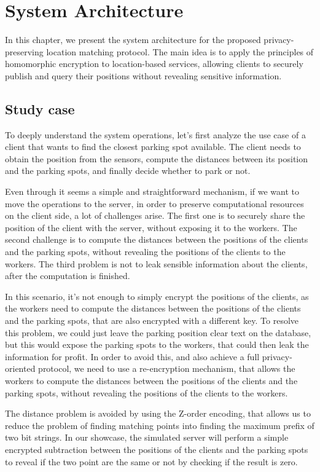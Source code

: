 \chapter{System Architecture}
In this chapter, we present the system architecture for the proposed privacy-preserving location matching protocol. The main idea is to apply the principles of homomorphic encryption to location-based services, allowing clients to securely publish and query their positions without revealing sensitive information.

\section{Study case}
To deeply understand the system operations, let's first analyze the use case of a client that wants to find the closest parking spot available. The client needs to obtain the position from the sensors, compute the distances between its position and the parking spots, and finally decide whether to park or not.

Even through it seems a simple and straightforward mechanism, if we want to move the operations to the server, in order to preserve computational resources on the client side, a lot of challenges arise. The first one is to securely share the position of the client with the server, without exposing it to the workers. The second challenge is to compute the distances between the positions of the clients and the parking spots, without revealing the positions of the clients to the workers. The third problem is not to leak sensible information about the clients, after the computation is finished.

In this scenario, it's not enough to simply encrypt the positions of the clients, as the workers need to compute the distances between the positions of the clients and the parking spots, that are also encrypted with a different key. To resolve this problem, we could just leave the parking position clear text on the database, but this would expose the parking spots to the workers, that could then leak the information for profit. In order to avoid this, and also achieve a full privacy-oriented protocol, we need to use a re-encryption mechanism, that allows the workers to compute the distances between the positions of the clients and the parking spots, without revealing the positions of the clients to the workers.

The distance problem is avoided by using the Z-order encoding, that allows us to reduce the problem of finding matching points into finding the maximum prefix of two bit strings. In our showcase, the simulated server will perform a simple encrypted subtraction between the positions of the clients and the parking spots to reveal if the two point are the same or not by checking if the result is zero. 


